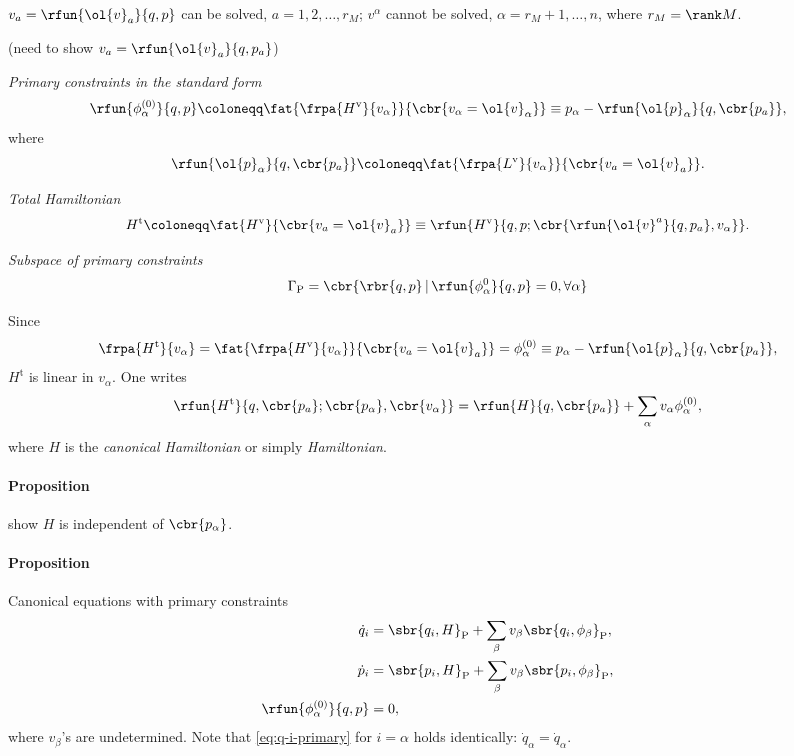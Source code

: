 \documentclass[a4paper,11pt]{article}
\begin{document}
$v_a = \rfun{\ol{v}_a}{q,p}$ can be solved, $a = 1, 2, \ldots, r_M$; $v^\alpha$ 
cannot be solved, $\alpha = r_M + 1, \ldots, n$, where $r_M = \rank M$.

(need to show $v_a = \rfun{\ol{v}_a}{q,p_a}$)

\emph{Primary constraints in the standard form}
\begin{equation}
\rfun{\phi_\alpha^{(0)}}{q, p} \coloneqq
\fat{\frpa{H^\text{v}}{v_\alpha}}{\cbr{v_\alpha = \ol{v}_\alpha}} \equiv
p_\alpha - \rfun{\ol{p}_\alpha}{q, \cbr{p_a}},
\end{equation}
where
\begin{equation}
\rfun{\ol{p}_\alpha}{q, \cbr{p_a}} 
\coloneqq \fat{\frpa{L^\text{v}}{v_\alpha}}{\cbr{v_a = \ol{v}_a}}.
\end{equation}


\emph{Total Hamiltonian}
\begin{equation}
H^\text{t} \coloneqq \fat{H^\text{v}}{\cbr{v_a = \ol{v}_a}} \equiv
\rfun{H^\text{v}}{q, p; \cbr{\rfun{\ol{v}^a}{q, p_a}, v_\alpha}}.
\end{equation}

\emph{Subspace of primary constraints}
\begin{equation}
\Gamma_\text{P} = \cbr{ \rbr{q, p}\, |\, \rfun{\phi_\alpha^{0}}{q, p} = 0, 
\forall \alpha}
\end{equation}

Since
\begin{equation}
\frpa{H^\text{t}}{v_\alpha} =
\fat{\frpa{H^\text{v}}{v_\alpha}}{\cbr{v_a = \ol{v}_a}} = \phi_\alpha^{(0)}
\equiv p_\alpha - \rfun{\ol{p}_\alpha}{q, \cbr{p_a}},
\end{equation}
$H^\text{t}$ is linear in $v_\alpha$. One writes
\begin{equation}
\rfun{H^\text{t}}{q, \cbr{p_a}; \cbr{p_\alpha}, \cbr{v_\alpha}} = \rfun{H}{q, 
\cbr{p_a}} + \sum_\alpha v_\alpha \phi_\alpha^{(0)},
\end{equation}
where $H$ is the \emph{canonical Hamiltonian} or simply \emph{Hamiltonian}. 

\paragraph{Proposition}
show $H$ is independent of $\cbr{p_\alpha}$.

\paragraph{Proposition}
Canonical equations with primary constraints
\begin{align}
\dot{q}_i &= \sbr{q_i, H}_\text{P} + \sum_\beta v_\beta 
\sbr{q_i, \phi_\beta}_\text{P},
\label{eq:q-i-primary}\\
\dot{p}_i &= \sbr{p_i, H}_\text{P} + \sum_\beta v_\beta 
\sbr{p_i, \phi_\beta}_\text{P}, \\
\rfun{\phi_\alpha^{(0)}}{q, p} &= 0,
\end{align}
where $v_\beta$'s are undetermined. Note that \cref{eq:q-i-primary} for $i = 
\alpha$ holds identically: $\dot{q}_\alpha = \dot{q}_\alpha$.
\end{document}

